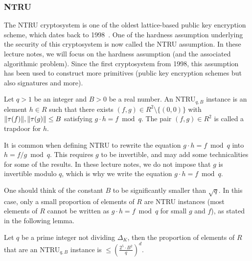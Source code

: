 \subsubsection{NTRU}
\label{sec:NTRU}
The NTRU cryptosystem is one of the oldest lattice-based public key encryption scheme, which dates back to 1998~\cite{NTRU}. One of the hardness assumption underlying the security of this cryptosystem is now called the NTRU assumption. In these lecture notes, we will focus on the hardness assumption (and the associated algorithmic problem). Since the first cryptosystem from 1998, this assumption has been used to construct more primitives (public key encryption schemes but also signatures and more). 

\begin{definition}
Let $q >1$ be an integer and $B >0$ be a real number. An NTRU$_{q,B}$ instance is an element $h \in R$ such that there exists $(f,g) \in R^2\setminus \{(0,0)\}$ with $\|\tau(f)\|, \|\tau(g)\| \leq B$ satisfying $g \cdot h = f \bmod q$. The pair $(f,g) \in R^2$ is called a trapdoor for $h$.
\end{definition}

It is common when defining NTRU to rewrite the equation $g \cdot h = f \bmod q$ into $h = f/g \bmod q$. This requires $g$ to be invertible, and may add some technicalities for some of the results. In these lecture notes, we do not impose that $g$ is invertible modulo $q$, which is why we write the equation $g \cdot h = f \bmod q$.

One should think of the constant $B$ to be significantly smaller than $\sqrt{q}$. In this case, only a small proportion of elements of $R$ are NTRU instances (most elements of $R$ cannot be written as $g \cdot h = f \bmod q$ for small $g$ and $f$), as stated in the following lemma.

\begin{lemma}
\label{lemma:proportion-NTRU-instances}
Let $q$ be a prime integer not dividing $\Delta_K$, then the proportion of elements of $R$ that are an NTRU$_{q,B}$ instance is $\leq \left( \frac{2^5 \cdot B^2}{q}\right)^d$.
\end{lemma}

